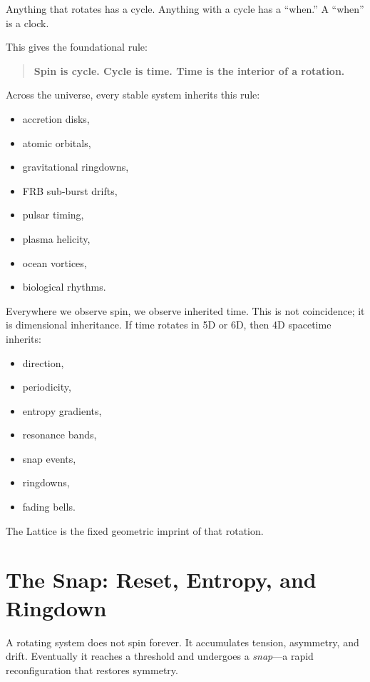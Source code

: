 \documentclass[11pt, letterpaper, openany]{book}
\begin{document}
Anything that rotates has a cycle.  
Anything with a cycle has a ``when.''  
A ``when'' is a clock.

This gives the foundational rule:

\begin{quote}
\textbf{Spin is cycle. Cycle is time. Time is the interior of a rotation.}
\end{quote}

Across the universe, every stable system inherits this rule:

\begin{itemize}
    \item accretion disks,
    \item atomic orbitals,
    \item gravitational ringdowns,
    \item FRB sub-burst drifts,
    \item pulsar timing,
    \item plasma helicity,
    \item ocean vortices,
    \item biological rhythms.
\end{itemize}

Everywhere we observe spin, we observe inherited time. This is not
coincidence; it is dimensional inheritance. If time rotates in 5D or 6D,
then 4D spacetime inherits:

\begin{itemize}
    \item direction,
    \item periodicity,
    \item entropy gradients,
    \item resonance bands,
    \item snap events,
    \item ringdowns,
    \item fading bells.
\end{itemize}

The Lattice is the fixed geometric imprint of that rotation.

\section{The Snap: Reset, Entropy, and Ringdown}

A rotating system does not spin forever. It accumulates tension,
asymmetry, and drift. Eventually it reaches a threshold and undergoes a
\emph{snap}---a rapid reconfiguration that restores symmetry.
\end{document}
